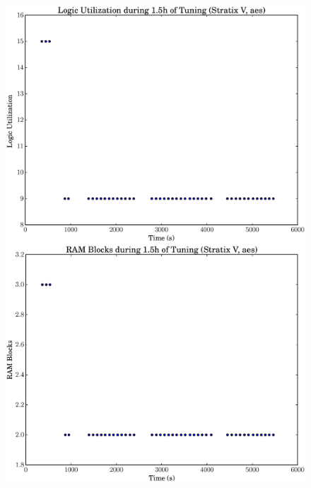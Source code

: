 \documentclass[12pt, a4paper]{article}
\begin{document}
\begin{figure}[htpb]
    \centering
    \noindent
    \begin{minipage}{.48\textwidth}
        \centering
        \includegraphics[scale=.25]{aes_lu_5400_chstone_StratixV}
    \end{minipage}%
    \hfill
    \begin{minipage}{.48\textwidth}
        \centering
        \includegraphics[scale=.25]{aes_ram_5400_chstone_StratixV}
    \end{minipage}%


\end{figure}
\end{document}
